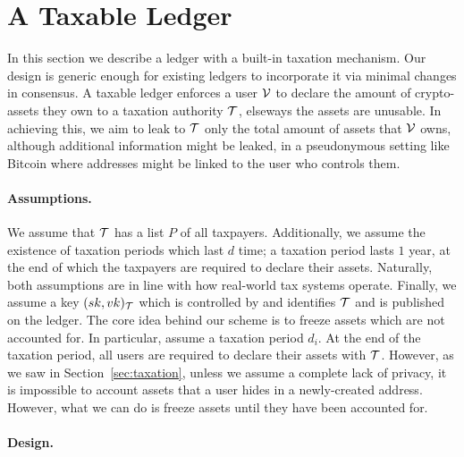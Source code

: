\section{A Taxable Ledger}\label{sec:taxchain}

In this section we describe a ledger with a built-in taxation mechanism. Our
design is generic enough for existing ledgers to incorporate it via minimal
changes in consensus. A taxable ledger enforces a user $\mathcal{V}$ to declare the
amount of crypto-assets they own to a taxation authority $\mathcal{T}$, elseways
the assets are unusable. In achieving this, we aim to leak to $\mathcal{T}$ only
the total amount of assets that $\mathcal{V}$ owns, although additional information
might be leaked, \eg in a pseudonymous setting like Bitcoin where addresses
might be linked to the user who controls them.

\paragraph{Assumptions.}

We assume that $\mathcal{T}$ has a list $P$ of all taxpayers.
Additionally, we assume the existence of taxation periods which last $d$ time;
\eg a taxation period lasts $1$ year, at the end of which the taxpayers are
required to declare their assets. Naturally, both assumptions are in line with
how real-world tax systems operate. Finally, we assume a key
$(sk, vk)_\mathcal{T}$ which is controlled by and identifies $\mathcal{T}$ and is
published on the ledger.
The core idea behind our scheme is to freeze assets which are not accounted
for. In particular, assume a taxation period $d_i$. At the end of the taxation
period, all users are required to declare their assets with $\mathcal{T}$.
However, as we saw in Section~\ref{sec:taxation}, unless we assume a complete
lack of privacy, it is impossible to account assets that a user hides in a
newly-created address. However, what we can do is freeze assets until they have
been accounted for.

\paragraph{Design.}

